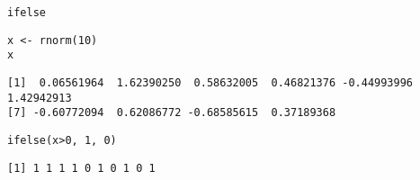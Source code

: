 \documentclass[xcolor={usenames,svgnames,dvipsnames}]{beamer}
\begin{document}
\begin{frame}[fragile,label={sec:orgf77a837}]{\texttt{ifelse}}
 \lstset{language=r,label= ,caption= ,captionpos=b,numbers=none}
\begin{lstlisting}
x <- rnorm(10)
x
\end{lstlisting}

\begin{verbatim}
[1]  0.06561964  1.62390250  0.58632005  0.46821376 -0.44993996  1.42942913
[7] -0.60772094  0.62086772 -0.68585615  0.37189368
\end{verbatim}

\lstset{language=r,label= ,caption= ,captionpos=b,numbers=none}
\begin{lstlisting}
ifelse(x>0, 1, 0)
\end{lstlisting}

\begin{verbatim}
[1] 1 1 1 1 0 1 0 1 0 1
\end{verbatim}
\end{frame}
\end{document}
